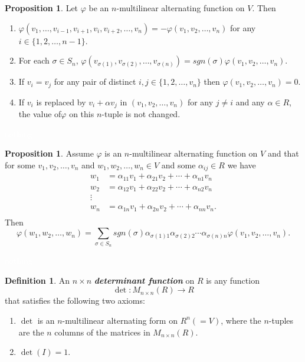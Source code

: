 \documentclass{article}
\theoremstyle{definition}
\newtheorem{prop}[thm]{Proposition}
\newtheorem{defn}[thm]{Definition}
\newcommand{\nl}{\textcolor{white}{nothing}}
\newcommand{\ra}{\rightarrow}
\newcommand{\al}{\alpha}
\newcommand{\vphi}{\varphi}
\begin{document}
\begin{prop}
Let $\vphi$ be an $n$-multilinear alternating function on $V$. Then 
\begin{enumerate}
\item $\vphi(v_1,\ldots, v_{i-1}, v_{i + 1}, v_i, v_{i + 2}, \ldots, v_n) = -\vphi(v_1, v_2, \ldots, v_n)$ for any $i\in \{1,2,\ldots, n-1\}$.

\item For each $\sigma\in S_n$, $\vphi(v_{\sigma(1)}, v_{\sigma(2)},\ldots, v_{\sigma(n)}) = sgn(\sigma)\vphi(v_1, v_2, \ldots, v_n)$.

\item If $v_i = v_j$ for any pair of distinct $i,j\in \{1,2,\ldots, v_n\}$ then $\vphi(v_1, v_2, \ldots, v_n) = 0$.

\item If $v_i$ is replaced by $v_i + \al v_j$ in $(v_1,v_2,\ldots,v_n)$ for any $j\neq i$ and any $\al \in R$, the value of$\vphi$ on this $n$-tuple is not changed.
\end{enumerate}
\end{prop}

\nl

\begin{prop}
Assume $\vphi$ is an $n$-multilinear alternating function on $V$ and that for some $v_1,v_2,\ldots,v_n$ and $w_1,w_2,\ldots,w_n\in V$ and some $\al_{ij}\in R$ we have
\begin{align*}
w_1 &= \al_{11}v_1 + \al_{21}v_2 + \cdots + \al_{n1}v_n\\
w_2 &= \al_{12}v_1 + \al_{22}v_2 + \cdots + \al_{n2}v_n\\
\vdots\\
w_n &= \al_{1n}v_1 + \al_{2n}v_2 + \cdots + \al_{nn}v_n.\\
\end{align*}
Then 
\[\vphi(w_1,w_2,\ldots,w_n) = \sum_{\sigma\in S_n} sgn(\sigma)\al_{\sigma(1)1}\al_{\sigma(2)2}\cdots\al_{\sigma(n)n}\vphi(v_1,v_2,\ldots,v_n).\]
\end{prop}

\nl

\begin{defn}
An $n\times n$ \textit{\textbf{determinant function}} on $R$ is any function 
\[\det:M_{n\times n}(R)\ra R\]
that satisfies the following two axioms:
\begin{enumerate}
\item $\det$ is an $n$-multilinear alternating form on $R^n( = V)$, where the $n$-tuples are the $n$ columns of the matrices in $M_{n\times n}(R)$.
\item $\det(I) = 1$.
\end{enumerate}
\end{defn}
\end{document}
